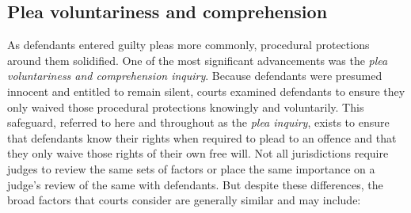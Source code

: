 \subsection{Plea voluntariness and comprehension}

As defendants entered guilty pleas more commonly, procedural protections around them solidified. One of the most significant advancements was the \textit{plea voluntariness and comprehension inquiry}. Because defendants were presumed innocent and entitled to remain silent, courts examined defendants to ensure they only waived those procedural protections knowingly and voluntarily. This safeguard, referred to here and throughout as the \textit{plea inquiry}, exists to ensure that defendants know their rights when required to plead to an offence and that they only waive those rights of their own free will. Not all jurisdictions require judges to review the same sets of factors or place the same importance on a judge's review of the same with defendants. But despite these differences, the broad factors that courts consider are generally similar and may include:

